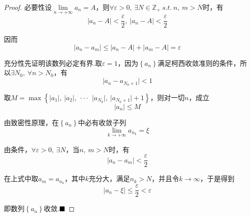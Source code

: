 \begin{proof}
	{\heiti 必要性}\qquad 设$\lim\limits_{n \to +\infty}a_n=A$，则$\forall \varepsilon>0,\ \exists N\in \mathbb{Z}_+\ s.t.\ n,\ m>N$时，有$$\lvert a_n-A\rvert <\frac{\varepsilon}{2},\ \lvert a_n-A\rvert <\frac{\varepsilon}{2}$$
	
	因而$$\lvert a_n-a_m\rvert \leqslant \lvert a_n-A\rvert + \lvert a_m-A\rvert=\varepsilon$$
	
	{\heiti 充分性}\qquad 先证明该数列必定有界.取$\varepsilon=1$，因为$\left\{a_n\right\}$满足柯西收敛准则的条件，所以$\exists N_0,\ \forall n>N_0$，有
	$$\lvert a_n-a_{N_0+1}\rvert <1$$
	
	取$M=\max\left\{\lvert a_1 \rvert,\ \lvert a_2 \rvert,\ \cdot\cdot\cdot\,\ \lvert a_{N_0} \rvert,\ \lvert a_{N_0+1} \rvert+1\right\}$，则对一切$n$，成立$$\lvert a_n \rvert\leqslant M$$
	
	由致密性原理，在$\left\{a_n\right\}$中必有收敛子列$$\lim_{k \to +\infty}a_{n_k}=\xi$$
	
	由条件，$\forall \varepsilon>0,\ \exists N$，当$n,\ m>N$时，有$$\lvert a_n-a_m\rvert <\frac{\varepsilon}{2}$$
	
	在上式中取$a_m=a_{n_k}$，其中$k$充分大，满足$n_k>N$，并且令$k \to \infty$，于是得到
	$$\lvert a_n-\xi \rvert\leqslant \frac{\varepsilon}{2}< \varepsilon $$
	
	即数列$\left\{a_n\right\}$收敛.$\hfill\blacksquare$
\end{proof}
